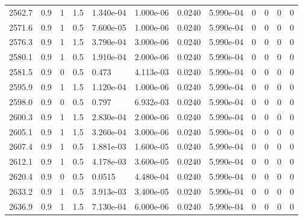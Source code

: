 \documentclass[preview]{standalone}
\begin{document}
{{{{{{{{{{{\begin{tabular}{L{1.2cm}C{1.2cm} C{0.3cm}C{0.5cm} C{1.4cm}C{1.4cm} C{1.4cm}C{1.4cm} C{1.6cm}C{1.6cm} C{1.6cm}C{1.6cm}}
  2562.7  &   0.9  & 1     & 1.5 &  1.340e-04  & 1.000e-06  &  0.0240&   5.990e-04& 0 & 0   &  0 & 0  \\ 
  2571.6  &   0.9  & 1     & 0.5 &  7.600e-05  & 1.000e-06  &  0.0240&   5.990e-04& 0 & 0   &  0 & 0  \\ 
  2576.3  &   0.9  & 1     & 1.5 &  3.790e-04  & 3.000e-06  &  0.0240&   5.990e-04& 0 & 0   &  0 & 0  \\ 
  2580.1  &   0.9  & 1     & 0.5 &  1.910e-04  & 2.000e-06  &  0.0240&   5.990e-04& 0 & 0   &  0 & 0  \\ 
  2581.5  &   0.9  & 0     & 0.5 &  0.473  & 4.113e-03  &  0.0240&   5.990e-04& 0 & 0   &  0 & 0  \\ 
  2595.9  &   0.9  & 1     & 1.5 &  1.120e-04  & 1.000e-06  &  0.0240&   5.990e-04& 0 & 0   &  0 & 0  \\ 
  2598.0  &   0.9  & 0     & 0.5 &  0.797  & 6.932e-03  &  0.0240&   5.990e-04& 0 & 0   &  0 & 0  \\ 
  2600.3  &   0.9  & 1     & 1.5 &  2.830e-04  & 2.000e-06  &  0.0240&   5.990e-04& 0 & 0   &  0 & 0  \\ 
  2605.1  &   0.9  & 1     & 1.5 &  3.260e-04  & 3.000e-06  &  0.0240&   5.990e-04& 0 & 0   &  0 & 0  \\ 
  2607.4  &   0.9  & 1     & 0.5 &  1.881e-03  & 1.600e-05  &  0.0240&   5.990e-04& 0 & 0   &  0 & 0  \\ 
  2612.1  &   0.9  & 1     & 0.5 &  4.178e-03  & 3.600e-05  &  0.0240&   5.990e-04& 0 & 0   &  0 & 0  \\ 
  2620.4  &   0.9  & 0     & 0.5 &  0.0515  & 4.480e-04  &  0.0240&   5.990e-04& 0 & 0   &  0 & 0  \\ 
  2633.2  &   0.9  & 1     & 0.5 &  3.913e-03  & 3.400e-05  &  0.0240&   5.990e-04& 0 & 0   &  0 & 0  \\ 
  2636.9  &   0.9  & 1     & 1.5 &  7.130e-04  & 6.000e-06  &  0.0240&   5.990e-04& 0 & 0   &  0 & 0  \\ 
\hline 
\end{tabular} 

}}}}}}}}}}}
\end{document}
